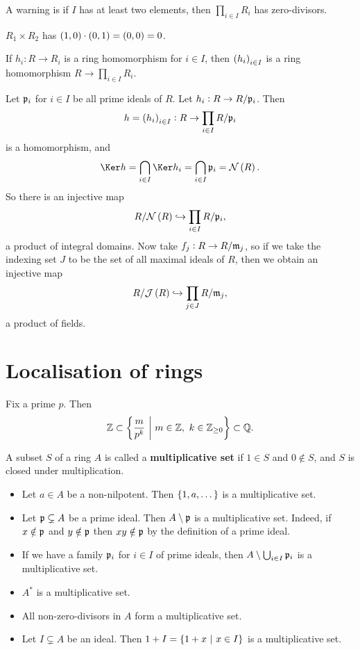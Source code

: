 A warning is if $ I $ has at least two elements, then $ \prod_{i \in I} R_i $ has zero-divisors.

\begin{example*}
$ R_1 \times R_2 $ has $ \br{1, 0} \cdot \br{0, 1} = \br{0, 0} = 0 $.
\end{example*}

If $ h_i : R \to R_i $ is a ring homomorphism for $ i \in I $, then $ \br{h_i}_{i \in I} $ is a ring homomorphism $ R \to \prod_{i \in I} R_i $.

\begin{remark}
Let $ \mathfrak{p}_i $ for $ i \in I $ be all prime ideals of $ R $. Let $ h_i : R \to R / \mathfrak{p}_i $. Then
$$ h = \br{h_i}_{i \in I} : R \to \prod_{i \in I} R / \ppp_i $$
is a homomorphism, and
$$ \Ker h = \bigcap_{i \in I} \Ker h_i = \bigcap_{i \in I} \ppp_i = \NNN\br{R}. $$
So there is an injective map
$$ R / \NNN\br{R} \hookrightarrow \prod_{i \in I} R / \ppp_i, $$
a product of integral domains. Now take $ f_j : R \to R / \mathfrak{m}_j $, so if we take the indexing set $ J $ to be the set of all maximal ideals of $ R $, then we obtain an injective map
$$ R / \JJJ\br{R} \hookrightarrow \prod_{j \in J} R / \mmm_j, $$
a product of fields.
\end{remark}

\pagebreak

\section{Localisation of rings}

\begin{example*}
Fix a prime $ p $. Then
$$ \ZZ \subset \cbr{\dfrac{m}{p^k} \st m \in \ZZ, \ k \in \ZZ_{\ge 0}} \subset \QQ. $$
\end{example*}

\begin{definition}
A subset $ S $ of a ring $ A $ is called a \textbf{multiplicative set} if $ 1 \in S $ and $ 0 \notin S $, and $ S $ is closed under multiplication.
\end{definition}

\begin{example}
\hfill
\begin{itemize}
\item Let $ a \in A $ be a non-nilpotent. Then $ \cbr{1, a, \dots} $ is a multiplicative set.
\item Let $ \mathfrak{p} \subsetneq A $ be a prime ideal. Then $ A \setminus \mathfrak{p} $ is a multiplicative set. Indeed, if $ x \notin \mathfrak{p} $ and $ y \notin \mathfrak{p} $ then $ xy \notin \mathfrak{p} $ by the definition of a prime ideal.
\item If we have a family $ \mathfrak{p}_i $ for $ i \in I $ of prime ideals, then $ A \setminus \bigcup_{i \in I} \mathfrak{p}_i $ is a multiplicative set.
\item $ A^* $ is a multiplicative set.
\item All non-zero-divisors in $ A $ form a multiplicative set.
\item Let $ I \subsetneq A $ be an ideal. Then $ 1 + I = \cbr{1 + x \st x \in I} $ is a multiplicative set.
\end{itemize}
\end{example}

